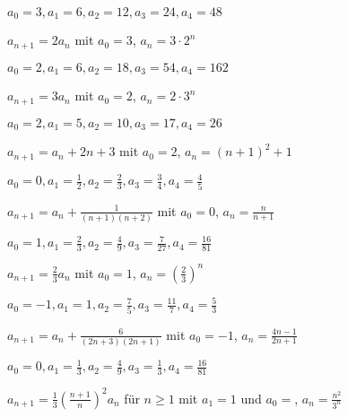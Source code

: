 \begin{exercisesK}
\begin{exercise} $a_{0}=3, a_{1}=6 ,a_{2}=12 ,a_{3}=24 , a_{4}=48 $ \begin{answer}
$a_{n+1} = 2a_{n}$ mit $a_{0}=3$, $a_{n}=3\cdot 2^{n}$
\end{answer}
\end{exercise}

\begin{exercise} $a_{0}=2, a_{1}=6 ,a_{2}= 18,a_{3}=54 , a_{4}=162 $ \begin{answer}
$a_{n+1} = 3a_{n}$ mit $a_{0}=2$, $a_{n}=2\cdot 3^{n}$
\end{answer}
\end{exercise}

\begin{exercise} $a_{0}=2, a_{1}=5 ,a_{2}=10 ,a_{3}=17 , a_{4}=26 $ \begin{answer}
$a_{n+1} = a_{n}+2n+3$ mit $a_{0}=2 $, $a_{n}=(n+1)^{2}+1$
\end{answer}
\end{exercise}

\begin{exercise} $a_{0}=0, a_{1}=\frac{1}{2} ,a_{2}= \frac{2}{3},a_{3}=\frac{3}{4} , a_{4}=\frac{4}{5} $ \begin{answer}
$a_{n+1} = a_{n} + \frac{1}{(n+1)(n+2)}$ mit $a_{0}=0 $, $a_{n}=\frac{n}{n+1}$
\end{answer}
\end{exercise}

\begin{exercise} $a_{0}=1, a_{1}= \frac{2}{3},a_{2}=\frac{4}{9} ,a_{3}=\frac{7}{27} , a_{4}= \frac{16}{81}$ \begin{answer}
$a_{n+1} =\frac{2}{3} a_{n}$ mit $a_{0}=1 $, $a_{n}=\left( \frac{2}{3} \right)^{n}$ 
\end{answer}
\end{exercise}

\begin{exercise} $a_{0}=-1, a_{1}=1 ,a_{2}=\frac{7}{5} ,a_{3}=\frac{11}{7} , a_{4}=\frac{5}{3} $ \begin{answer}
$a_{n+1} = a_{n} + \frac{6}{(2n+3)(2n+1)}$ mit $a_{0}=-1 $, $a_{n}=\frac{4n-1}{2n+1}$
\end{answer}
\end{exercise}

\begin{exercise} $a_{0}=0, a_{1}=\frac{1}{3} ,a_{2}=\frac{4}{9} ,a_{3}= \frac{1}{3}, a_{4}= \frac{16}{81}$ \begin{answer}
$a_{n+1} = \frac{1}{3} \left( \frac{n+1}{n} \right)^{2} a_{n}$ für $n \geq 1$ mit $a_{1} = 1$ und $a_{0}= $, $a_{n}=\frac{n^{2}}{3^{n}}$
\end{answer}
\end{exercise}
\endtwocol


\end{exercisesK}


